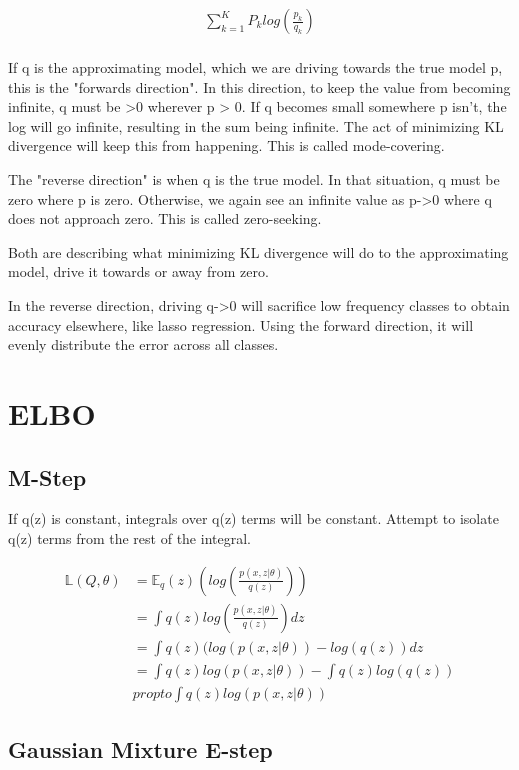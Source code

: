 \documentclass[11pt]{article}
\begin{document}
\begin{align}
	\sum_{k=1}^{K}P_klog(\frac{p_k}{q_k}) \\
\end{align}

 If q is the approximating model, which we are driving towards the true model p, this is the "forwards direction". In this direction, to keep the value from becoming infinite, q must be >0 wherever p > 0. If q becomes small somewhere p isn't, the log will go infinite, resulting in the sum being infinite. The act of minimizing KL divergence will keep this from happening. This is called mode-covering.
 
The "reverse direction" is when q is the true model. In that situation, q must be zero where p is zero. Otherwise, we again see an infinite value as p->0 where q does not approach zero. This is called zero-seeking.

Both are describing what minimizing KL divergence will do to the approximating model, drive it towards or away from zero.


In the reverse direction, driving q->0 will sacrifice low frequency classes to obtain accuracy elsewhere, like lasso regression. Using the forward direction, it will evenly distribute the error across all classes.

\section{ELBO}

\subsection{M-Step}

If q(z) is constant, integrals over q(z) terms will be constant. Attempt to isolate q(z) terms from the rest of the integral.

\begin{align}
	\mathbb{L}(Q, \theta) &= \mathbb{E}_q(z)(log(\frac{p(x,z|\theta)}{q(z)}))\\
	&= \int q(z)log(\frac{p(x,z|\theta)}{q(z)})dz \\
	&= \int q(z)(log(p(x,z|\theta)) - log(q(z))dz \\
	&= \int q(z)log(p(x,z|\theta)) - \int q(z)log(q(z)) \\
	&propto  \int q(z)log(p(x,z|\theta))
\end{align}

\subsection{Gaussian Mixture E-step}
\end{document}
